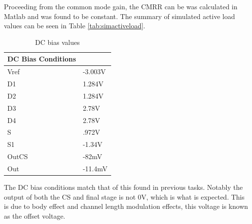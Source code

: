 Proceeding from the common mode gain, the CMRR can be was calculated in Matlab and was found to be constant. The summary of simulated active load values can be seen in Table \ref{tab:simactiveload}.


\begin{table}[H]
	\centering
	\caption{DC bias values}
	\label{tab:simactiveloadl}
	\begin{tabular}{|l|l|}
		\hline
		\textbf{DC Bias Conditions} &         \\ \hline
		Vref                        & -3.003V \\ \hline
		D1                          & 1.284V  \\ \hline
		D2                          & 1.284V  \\ \hline
		D3                          & 2.78V   \\ \hline
		D4                          & 2.78V   \\ \hline
		S                           & .972V   \\ \hline
		S1                          & -1.34V  \\ \hline
		OutCS                       & -82mV   \\ \hline
		Out                         & -11.4mV \\ \hline
	\end{tabular}
\end{table}

The DC bias conditions match that of this found in previous tasks. Notably the output of both the CS  and final stage is not 0V, which is what is expected. This is due to body effect and channel length modulation effects, this voltage is known as the offset voltage.




